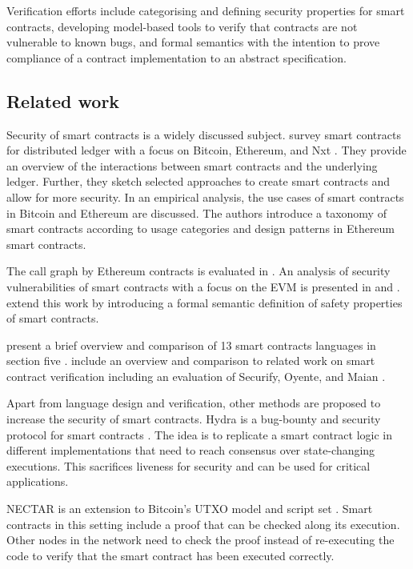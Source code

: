 \documentclass{llncs}
\begin{document}
Verification efforts include categorising and defining security properties for smart contracts, developing model-based tools to verify that contracts are not vulnerable to known bugs, and formal semantics with the intention to prove compliance of a contract implementation to an abstract specification.

\subsection{Related work}
Security of smart contracts is a widely discussed subject.
\citeauthor{Seijas2017} survey smart contracts for distributed ledger with a focus on Bitcoin, Ethereum, and Nxt \cite{Seijas2017}.
They provide an overview of the interactions between smart contracts and the underlying ledger.
Further, they sketch selected approaches to create smart contracts and allow for more security.
In an empirical analysis, the use cases of smart contracts in Bitcoin and Ethereum are discussed\cite{Bartoletti2017}.
The authors introduce a taxonomy of smart contracts according to usage categories and design patterns in Ethereum smart contracts.

The call graph by Ethereum contracts is evaluated in \cite{Frowis2017}.
An analysis of security vulnerabilities of smart contracts with a focus on the EVM is presented in \cite{Luu2016} and \cite{Atzei2017}.
\citeauthor{Grishchenko2018} extend this work by introducing a formal semantic definition of safety properties of smart contracts.

\citeauthor{Sergey2018} present a brief overview and comparison of 13 smart contracts languages in section five \cite{Sergey2018}. \citeauthor{Tsankov2017} include an overview and comparison to related work on smart contract verification including an evaluation of Securify, Oyente, and Maian \cite{Tsankov2017}.

Apart from language design and verification, other methods are proposed to increase the security of smart contracts. Hydra is a bug-bounty and security protocol for smart contracts \cite{Breidenbach2018}. The idea is to replicate a smart contract logic in different implementations that need to reach consensus over state-changing executions. This sacrifices liveness for security and can be used for critical applications.

NECTAR is an extension to Bitcoin's UTXO model and script set \cite{Covaci2018}. Smart contracts in this setting include a proof that can be checked along its execution. Other nodes in the network need to check the proof instead of re-executing the code to verify that the smart contract has been executed correctly.
\end{document}
